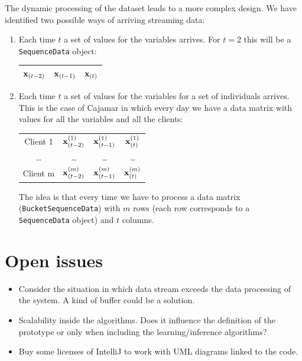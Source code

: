 \documentclass[a4paper,12pt]{article}
\begin{document}
The dynamic processing of the dataset leads to a more complex design. We have identified two possible ways of arriving streaming data:

\begin{enumerate}
\item Each time $t$ a set of values for the variables arrives. For $t=2$ this will be a \texttt{SequenceData} object:
	\begin{center}
	\begin{tabular}{|c|c|c|}
	\hline
	$\x_{(t-2)}$ & $\x_{(t-1)}$ & $\x_{(t)}$\\
	\hline
	\end{tabular}
	\end{center}
	
	 

\item Each time $t$ a set of values for the variables for a set of individuals arrives. This is the case of Cajamar in which every day we have a data matrix with values for all the variables and all the clients:

	\begin{center}
	\begin{tabular}{|c|c|c|c|}
	\hline
	Client 1  & $\x^{(1)}_{(t-2)}$ & $\x^{(1)}_{(t-1)}$ & $\x^{(1)}_{(t)}$\\
	\ldots      & \ldots  & \ldots  & \ldots \\
	Client m  & $\x^{(m)}_{(t-2)}$ & $\x^{(m)}_{(t-1)}$ & $\x^{(m)}_{(t)}$\\	\hline
	\end{tabular}
	\end{center}
	The idea is that every time we have to process a data matrix (\texttt{BucketSequenceData}) with $m$ rows (each row corresponds to a \texttt{SequenceData} object) and $t$ columns.
\end{enumerate}

\section{Open issues}

\begin{itemize}
\item Consider the situation in which data stream exceeds the data processing of the system. A kind of buffer could be a solution. 
\item Scalability inside the algorithms. Does it influence the definition of the prototype or only when including the learning/inference algorithms?
\item Buy some licenses of IntelliJ to work with UML diagrams linked to the code. 
\end{itemize}

 
\end{document}
